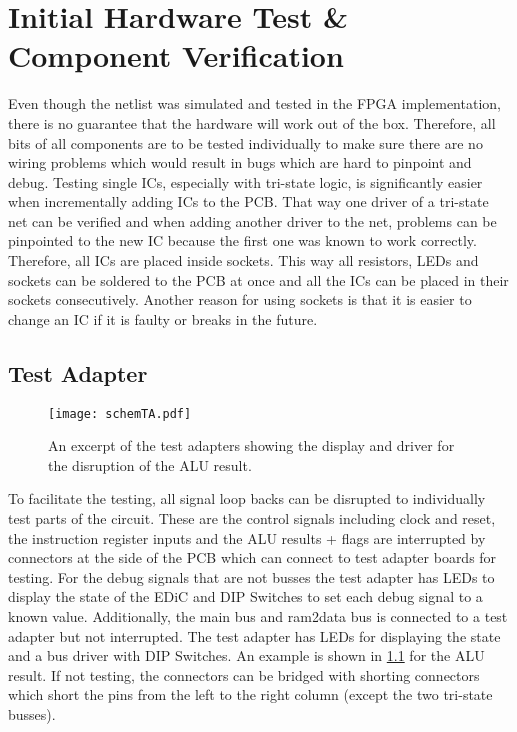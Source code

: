 \chapter{Initial Hardware Test \& Component Verification}\label{cha:eval}
Even though the netlist was simulated and tested in the \gls{FPGA} implementation, there is no guarantee that the hardware will work out of the box.
Therefore, all bits of all components are to be tested individually to make sure there are no wiring problems which would result in bugs which are hard to pinpoint and debug.
Testing single \glspl{IC}, especially with tri-state logic, is significantly easier when incrementally adding \glspl{IC} to the \gls{PCB}.
That way one driver of a tri-state net can be verified and when adding another driver to the net, problems can be pinpointed to the new \gls{IC} because the first one was known to work correctly.
Therefore, all \glspl{IC} are placed inside sockets.
This way all resistors, \glspl{LED} and sockets can be soldered to the \gls{PCB} at once and all the \glspl{IC} can be placed in their sockets consecutively.
Another reason for using sockets is that it is easier to change an \gls{IC} if it is faulty or breaks in the future.
\section{Test Adapter}\label{sec:testAdapter}
\begin{figure}[t]
  \centering
  \texttt{[image: schemTA.pdf]}
  \caption{An excerpt of the test adapters showing the display and driver for the disruption of the \gls{ALU} result.}
  \label{fig:schTA}
\end{figure}
To facilitate the testing, all signal loop backs can be disrupted to individually test parts of the circuit.
These are the control signals including clock and reset, the instruction register inputs and the \gls{ALU} results + flags are interrupted by connectors at the side of the \gls{PCB} which can connect to test adapter boards for testing.
For the debug signals that are not busses the test adapter has \glspl{LED} to display the state of the \gls{EDiC} and DIP Switches to set each debug signal to a known value.
Additionally, the main bus and ram2data bus is connected to a test adapter but not interrupted.
The test adapter has \glspl{LED} for displaying the state and a bus driver with DIP Switches.
An example is shown in \cref{fig:schTA} for the \gls{ALU} result.
If not testing, the connectors can be bridged with shorting connectors which short the pins from the left to the right column (except the two tri-state busses).

